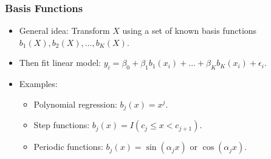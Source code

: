 \documentclass[12pt,a4paper]{article}
\begin{document}
\begin{itemize}
    \subsubsection{Basis Functions }
        \begin{itemize}
            \item General idea: Transform $X$ using a set of known basis functions $b_1(X), b_2(X), \dots, b_K(X)$.
            \item Then fit linear model: $y_i = \beta_0 + \beta_1 b_1(x_i) + \dots + \beta_K b_K(x_i) + \epsilon_i$.
            \item Examples:
                \begin{itemize}
                    \item Polynomial regression: $b_j(x) = x^j$.
                    \item Step functions: $b_j(x) = I(c_j \le x < c_{j+1})$.
                    \item Periodic functions: $b_j(x) = \sin(\alpha_j x)$ or $\cos(\alpha_j x)$.
                \end{itemize}
        \end{itemize}


\end{itemize}
\end{document}
